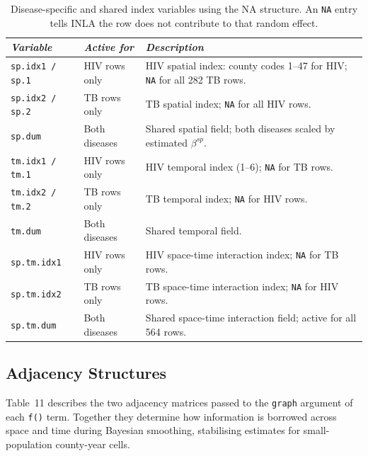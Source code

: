\documentclass[11pt,a4paper]{article}
\newcommand{\code}[1]{\texttt{\small #1}}
\begin{document}
\begin{table}[H]
\caption{Disease-specific and shared index variables using the NA structure. An \texttt{NA} entry tells INLA the row does not contribute to that random effect.}
\renewcommand{\arraystretch}{1.10}
\scriptsize\begin{tabularx}{\textwidth}{@{}L{3.3cm}L{2.8cm}X@{}}
\toprule
\textit{Variable} & \textit{Active for} & \textit{Description}\\
\midrule
\code{sp.idx1\,/\,sp.1} & HIV rows only  & HIV spatial index: county codes 1--47 for HIV; \texttt{NA} for all 282 TB rows.\\
\code{sp.idx2\,/\,sp.2} & TB rows only   & TB spatial index; \texttt{NA} for all HIV rows.\\
\code{sp.dum}            & Both diseases  & Shared spatial field; both diseases scaled by estimated $\beta^{sp}$.\\
\code{tm.idx1\,/\,tm.1} & HIV rows only  & HIV temporal index (1--6); \texttt{NA} for TB rows.\\
\code{tm.idx2\,/\,tm.2} & TB rows only   & TB temporal index; \texttt{NA} for HIV rows.\\
\code{tm.dum}            & Both diseases  & Shared temporal field.\\
\code{sp.tm.idx1}        & HIV rows only  & HIV space-time interaction index; \texttt{NA} for TB rows.\\
\code{sp.tm.idx2}        & TB rows only   & TB space-time interaction index; \texttt{NA} for HIV rows.\\
\code{sp.tm.dum}         & Both diseases  & Shared space-time interaction field; active for all 564 rows.\\
\bottomrule
\end{tabularx}
\renewcommand{\arraystretch}{1.10}
\end{table}

\subsection{Adjacency Structures}

Table~11 describes the two adjacency matrices passed to the \code{graph}
argument of each \code{f()} term. Together they determine how information
is borrowed across space and time during Bayesian smoothing, stabilising
estimates for small-population county-year cells.
\end{document}
